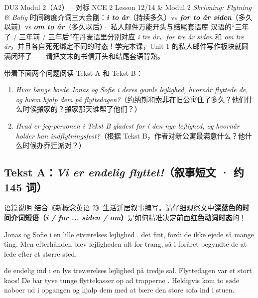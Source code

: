 {DU3 Modul 2（A2）｜对标 NCE 2 Lesson 12/14 \& Modul 2 \textit{Skrivning: Flytning \& Bolig}}
{时间跨度介词三大金刚：\textbf{\textit{i to år}}（持续多久）vs \textbf{\textit{for to år siden}}（多久以前）vs \textbf{\textit{om to år}}（多久以后）· 私人邮件万能开头与结尾套语库}
{汉语的“三年了 / 三年前 / 三年后”在丹麦语里分别对应 \textit{i tre år}、\textit{for tre år siden} 和 \textit{om tre år}，并且各自死死绑定不同的时态！学完本课，Unit 1 的私人邮件写作板块就圆满闭环了——请把文末的书信开头和结尾套语背熟。}

\begin{foerduleaeser}
带着下面两个问题阅读 Tekst A 和 Tekst B：
\begin{enumerate}
  \item \textit{Hvor længe boede Jonas og Sofie i deres gamle lejlighed, hvornår flyttede de, og hvem hjalp dem på flyttedagen?}（约纳斯和索菲在旧公寓住了多久？他们什么时候搬家的？搬家那天谁帮了他们？）
  \item \textit{Hvad er jeg-personen i Tekst B gladest for i den nye lejlighed, og hvornår holder han indflytningsfest?}（根据 Tekst B，作者对新公寓最满意什么？他什么时候办乔迁派对？）
\end{enumerate}
\end{foerduleaeser}


\subsection*{Tekst A：\textit{Vi er endelig flyttet!}（叙事短文 · 约 145 词）}

\begin{tipbox}{语篇说明}
结合《新概念英语 2》生活迁居叙事编写。请仔细观察文中\textbf{\color{NCDNavy}深蓝色的时间介词短语（\textit{i / for ... siden / om}）}是如何精准决定前面\textbf{\color{NCDRed}红色动词时态}的！
\end{tipbox}

Jonas og Sofie  i en lille etværelses lejlighed .   det fint, fordi de ikke ejede så mange ting. Men efterhånden blev lejligheden alt for trang, så i foråret begyndte de at lede efter et større sted.

  de endelig ind i en lys treværelses lejlighed på tredje sal. Flyttedagen var et stort kaos! De bar tyve tunge flyttekasser op ad trapperne . Heldigvis kom to søde naboer ud i opgangen og hjalp dem med at bære den store sofa ind i stuen.

